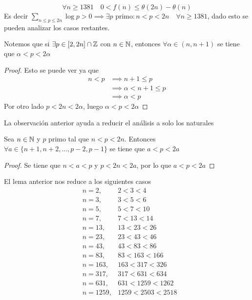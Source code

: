 \begin{sol}
	\[\forall n\geq1381\quad0<f(n)\leq\theta(2n)-\theta(n)\]
	Es decir $\displaystyle\sum_{n\leq p\leq 2n}\log{p}>0\implies\exists p\text{ primo}:n<p<2n\quad\forall n\geq1381$, dado esto se pueden analizar los casos restantes.
	\begin{obs}
		Notemos que si $\exists p\in[2,2n]\cap\mathbb{Z}$ con $n\in\mathbb{N}$, entonces $\forall\alpha\in(n,n+1)$ se tiene que $\alpha<p<2\alpha$
		\begin{proof}
			Esto se puede ver ya que
			\begin{align*}
				n<p & \implies n+1\leq p       \\
				    & \implies\alpha<n+1\leq p \\
				    & \implies\alpha<p
			\end{align*}
			Por otro lado $p<2n<2\alpha$, luego $\alpha<p<2\alpha$
		\end{proof}
	\end{obs}
	{\flushleft La observación anterior ayuda a reducir el análisis a solo los naturales}
	\begin{lem}
		Sea $n\in\mathbb{N}$ y $p$ primo tal que $n<p<2n$. Entonces $\forall a\in\{n+1,n+2,...,p-2,p-1\}$ se tiene que $a<p<2a$
		\begin{proof}
			Se tiene que $n<a<p$ y $p<2n<2a$, por lo que $a<p<2a$
		\end{proof}
	\end{lem}
	{\flushleft El lema anterior nos reduce a los siguientes casos}
	\begin{align*}
		 & n=2,    & 2<3<4          \\
		 & n=3,    & 3<5<6          \\
		 & n=5,    & 5<7<10         \\
		 & n=7,    & 7<13<14        \\
		 & n=13,   & 13<23<26       \\
		 & n=23,   & 23<43<46       \\
		 & n=43,   & 43<83<86       \\
		 & n=83,   & 83<163<166     \\
		 & n=163,  & 163<317<326    \\
		 & n=317,  & 317<631<634    \\
		 & n=631,  & 631<1259<1262  \\
		 & n=1259, & 1259<2503<2518 \\
	\end{align*}

\end{sol}

